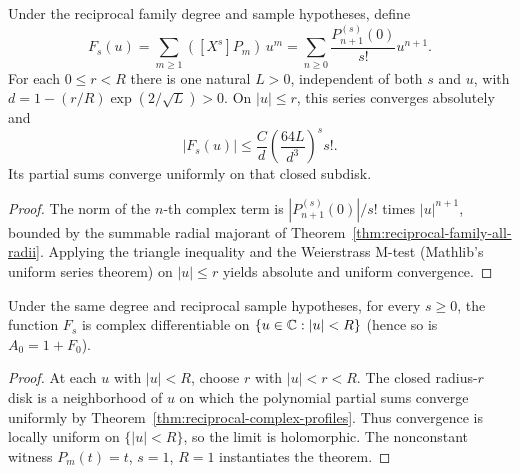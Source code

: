 \begin{theorem}
\label{thm:reciprocal-complex-profiles}
\leanok
{}
Under the reciprocal family degree and sample hypotheses, define
\[
 F_s(u)=\sum_{m\ge1}([X^s]P_m)\,u^{m} = \sum_{n\ge0}\frac{P_{n+1}^{(s)}(0)}{s!}u^{n+1}.
\]
For each $0\le r<R$ there is one natural $L>0$, independent of both
$s$ and $u$, with $d=1-(r/R)\exp(2/\sqrt L)>0$.
On $|u|\le r$, this series converges absolutely and
\[
 |F_s(u)|\le \frac{C}{d}\left(\frac{64L}{d^3}\right)^s s!.
\]
Its partial sums converge uniformly on that closed subdisk.
\end{theorem}
\begin{proof}
The norm of the $n$-th complex term is $|P_{n+1}^{(s)}(0)|/s!$ times $|u|^{n+1}$, bounded by the summable radial majorant of Theorem~\ref{thm:reciprocal-family-all-radii}. Applying the triangle inequality and the Weierstrass M-test (Mathlib's uniform series theorem) on $|u| \le r$ yields absolute and uniform convergence.
\end{proof}

\begin{theorem}
\label{thm:reciprocal-profile-holomorphy}
\leanok
{}
Under the same degree and reciprocal sample hypotheses, for every $s\ge0$,
the function $F_s$ is complex differentiable on $\{u\in\mathbb{C}:|u|<R\}$ (hence so is $A_0 = 1 + F_0$).
\end{theorem}
\begin{proof}
At each $u$ with $|u| < R$, choose $r$ with $|u|<r<R$. The closed radius-$r$ disk is a
neighborhood of $u$ on which the polynomial partial sums converge uniformly by Theorem~\ref{thm:reciprocal-complex-profiles}.
Thus convergence is locally uniform on $\{|u|<R\}$, so the limit is holomorphic.
The nonconstant witness $P_m(t)=t$, $s=1$, $R=1$ instantiates the theorem.
\end{proof}


